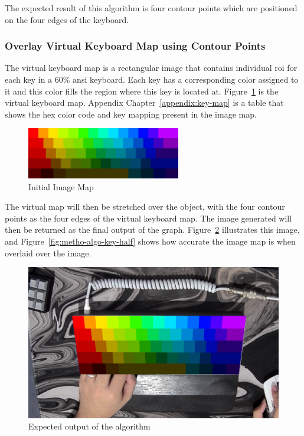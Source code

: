 \documentclass{report}
\begin{document}
The expected result of this algorithm is four contour points which are
positioned on the four edges of the keyboard.

\subsubsection{Overlay Virtual Keyboard Map using Contour Points}
The virtual keyboard map is a rectangular image that contains individual
\ac{roi} for each key in a 60\% \ac{ansi} keyboard. Each key has a corresponding
color assigned to it and this color fills the region where this key is located
at. Figure~\ref{fig:metho-algo-key-map} is the virtual keyboard map. Appendix
Chapter~\ref{appendix:key-map} is a table that shows the hex color code and key
mapping present in the image map.

\begin{figure}[H]
	\centering
	\includegraphics[width=0.6\textwidth]{image-map.png}
	\caption{Initial Image Map}
	\label{fig:metho-algo-key-map}
	\centering
\end{figure}

The virtual map will then be stretched over the object, with the four contour
points as the four edges of the virtual keyboard map. The image generated will
then be returned as the final output of the graph.
Figure~\ref{fig:metho-algo-key-overlay} illustrates this image, and
Figure~\ref{fig:metho-algo-key-half} shows how accurate the image map is when
overlaid over the image.

\begin{figure}[H]
	\centering
	\includegraphics[width=1\textwidth]{image-map-final.png}
	\caption{Expected output of the algorithm}
	\label{fig:metho-algo-key-overlay}
	\centering
\end{figure}
\end{document}
